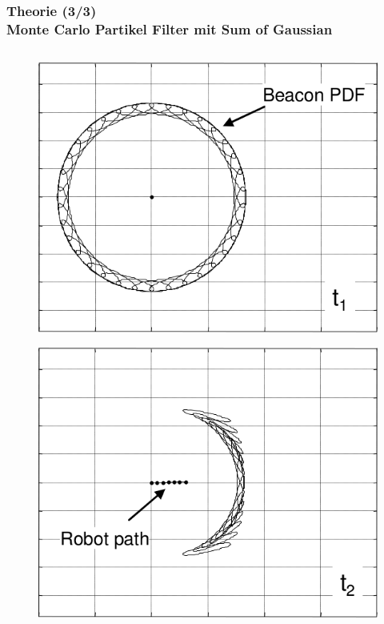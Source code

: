 \documentclass{beamer}
\begin{document}
%
%
\begin{frame}
	\frametitle{Theorie (3/3)\\Monte Carlo Partikel Filter mit Sum of Gaussian}
	\begin{columns}
			\begin{overlayarea}{\textwidth}{.5\textheight}
				\only<1>
				{
					\begin{figure}
						\centering
						\includegraphics[width=\linewidth]{blanco2008efficient_fig3_1}
						\caption{\cite{blanco2008efficient}}
					\end{figure}
				}
				{
					\begin{figure}
						\centering
						\includegraphics[width=\linewidth]{blanco2008efficient_fig3_2}

\end{figure}}
\end{overlayarea}
\end{columns}
\end{frame}
\end{document}
